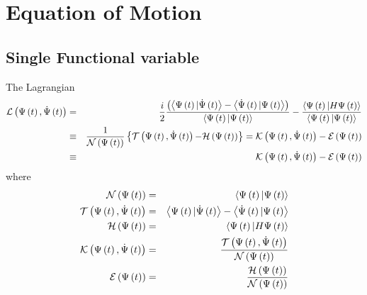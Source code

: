 \section{Equation of Motion}

\subsection{Single Functional variable}

The Lagrangian 
\begin{eqnarray}
{\cal L}\left( \Psi \left( t\right) ,\dot{\Psi}\left( t\right) \right) &=&%
\frac{i}{2}\frac{\left( \left\langle \Psi \left( t\right) |\dot{\Psi}\left(
t\right) \right\rangle -\left\langle \dot{\Psi}\left( t\right) |\Psi \left(
t\right) \right\rangle \right) }{\left\langle \Psi \left( t\right) |\Psi
\left( t\right) \right\rangle }-\frac{\left\langle \Psi \left( t\right)
|H\Psi \left( t\right) \right\rangle }{\left\langle \Psi \left( t\right)
|\Psi \left( t\right) \right\rangle }  \nonumber \\
&\equiv &\frac{1}{{\cal N}\left( \Psi \left( t\right) \right) }\left\{ {\cal %
T}\left( \Psi \left( t\right) ,\dot{\Psi}\left( t\right) \right) {\cal -H}%
\left( \Psi \left( t\right) \right) \right\} ={\cal K}\left( \Psi \left(
t\right) ,\dot{\Psi}\left( t\right) \right) -{\cal E}\left( \Psi \left(
t\right) \right)  \nonumber \\
&\equiv &{\cal K}\left( \Psi \left( t\right) ,\dot{\Psi}\left( t\right)
\right) -{\cal E}\left( \Psi \left( t\right) \right)  \label{La}
\end{eqnarray}%
where 
\begin{eqnarray}
{\cal N}\left( \Psi \left( t\right) \right) &=&\left\langle \Psi \left(
t\right) |\Psi \left( t\right) \right\rangle  \nonumber \\
{\cal T}\left( \Psi \left( t\right) ,\dot{\Psi}\left( t\right) \right)
&=&\left\langle \Psi \left( t\right) |\dot{\Psi}\left( t\right)
\right\rangle -\left\langle \dot{\Psi}\left( t\right) |\Psi \left( t\right)
\right\rangle  \nonumber \\
{\cal H}\left( \Psi \left( t\right) \right) &=&\left\langle \Psi \left(
t\right) |H\Psi \left( t\right) \right\rangle  \nonumber \\
{\cal K}\left( \Psi \left( t\right) ,\dot{\Psi}\left( t\right) \right) &=&%
\frac{{\cal T}\left( \Psi \left( t\right) ,\dot{\Psi}\left( t\right) \right) 
}{{\cal N}\left( \Psi \left( t\right) \right) }  \nonumber \\
{\cal E}\left( \Psi \left( t\right) \right) &=&\frac{{\cal H}\left( \Psi
\left( t\right) \right) }{{\cal N}\left( \Psi \left( t\right) \right) }
\end{eqnarray}%
